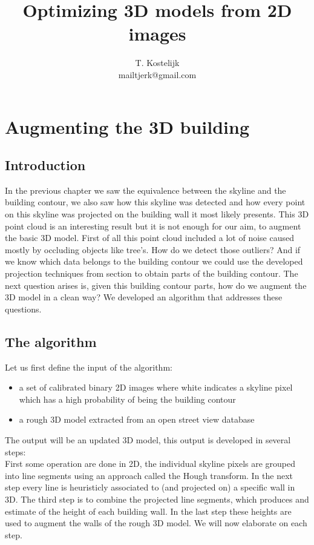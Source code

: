 \documentclass[10pt]{article}
\title{\sc Optimizing 3D models from 2D images}
\author{T. Kostelijk\\mailtjerk@gmail.com}
\begin{document}
\maketitle


\section{Augmenting the 3D building}
\subsection{Introduction}
In the previous chapter we saw the equivalence between the skyline and the building contour, we also saw how this skyline was detected and how every point on this skyline was projected on the building wall it most likely presents. 
This 3D point cloud is an interesting result but it is not enough for our aim, to augment the basic 3D model.
First of all this point cloud included a lot of noise caused mostly by occluding objects like tree's. How do we detect those outliers?
And if we know which data belongs to the building contour we could use the developed projection techniques from section %
to obtain parts of the building contour.
The next question arises is, given this building contour parts, how do we augment the 3D model in a clean way?
We developed an algorithm that addresses these questions.
\subsection{The algorithm}
Let us first define the input of the algorithm:
\begin{itemize}
	\item a set of calibrated binary 2D images where white indicates a skyline pixel which has a high probability of being the building contour
	\item a rough 3D model extracted from an open street view database
\end{itemize}
The output will be an updated 3D model, this output is developed in several steps:\\
First some operation are done in 2D, the individual skyline pixels are grouped into line segments using an approach called the Hough transform. In the next step every line is heuristicly associated to (and projected on) a specific wall in 3D. The third step is to combine the projected line segments, which produces and estimate of the height of each building wall. In the last step these heights are used to augment the walls of the rough 3D model.
We will now elaborate on each step.
\end{document}
